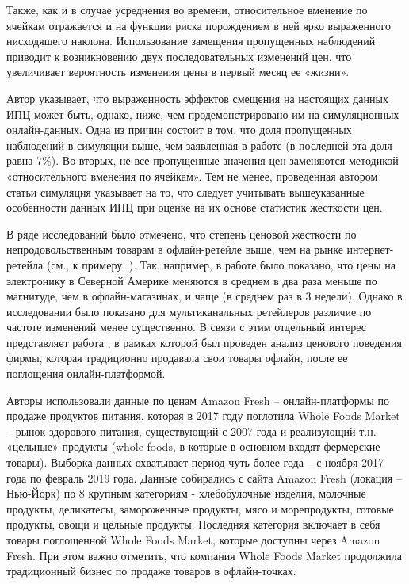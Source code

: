 Также, как и в случае усреднения во времени, относительное вменение по ячейкам отражается и на функции риска порождением в ней ярко выраженного нисходящего наклона. Использование замещения пропущенных наблюдений приводит к возникновению двух последовательных изменений цен, что увеличивает вероятность изменения цены в первый месяц ее «жизни». 

Автор указывает, что выраженность эффектов смещения на настоящих данных ИПЦ может быть, однако, ниже, чем продемонстрировано им на симуляционных онлайн-данных. Одна из причин состоит в том, что доля пропущенных наблюдений в симуляции выше, чем заявленная в работе \cite{KlenowKryvtsov2008} (в последней эта доля равна 7\%). Во-вторых, не все пропущенные значения цен заменяются методикой «относительного вменения по ячейкам». Тем не менее, проведенная автором статьи симуляция указывает на то, что следует учитывать вышеуказанные особенности данных ИПЦ при оценке на их основе статистик жесткости цен.

В ряде исследований было отмечено, что степень ценовой жесткости по непродовольственным товарам в офлайн-ретейле выше, чем на рынке интернет-ретейла (см., к примеру, \cite{gorodnichenko2018price, gorodnichenko2017price}). Так, например, в работе \cite{gorodnichenko2017price} было показано, что цены на электронику в Северной Америке меняются в среднем в два раза меньше по магнитуде, чем в офлайн-магазинах, и чаще (в среднем раз в 3 недели). Однако в исследовании \cite{cavallo2016online} было показано для мультиканальных ретейлеров различие по частоте изменений менее существенно. В связи с этим отдельный интерес представляет работа \cite{HILLEN202163}, в рамках которой был проведен анализ ценового поведения фирмы, которая традиционно продавала свои товары офлайн, после ее поглощения онлайн-платформой.

Авторы использовали данные по ценам Amazon Fresh – онлайн-платформы по продаже продуктов питания, которая в 2017 году поглотила Whole Foods Market – рынок здорового питания, существующий с 2007 года и реализующий т.н. «цельные» продукты (whole foods, в которые в основном входят фермерские товары). Выборка данных охватывает период чуть более года – с ноября 2017 года по февраль 2019 года. Данные собирались с сайта Amazon Fresh (локация – Нью-Йорк) по 8 крупным категориям - хлебобулочные изделия, молочные продукты, деликатесы, замороженные продукты, мясо и морепродукты, готовые продукты, овощи и цельные продукты. Последняя категория включает в себя товары поглощенной Whole Foods Market, которые доступны через Amazon Fresh. При этом важно отметить, что компания Whole Foods Market продолжила традиционный бизнес по продаже товаров в офлайн-точках.

